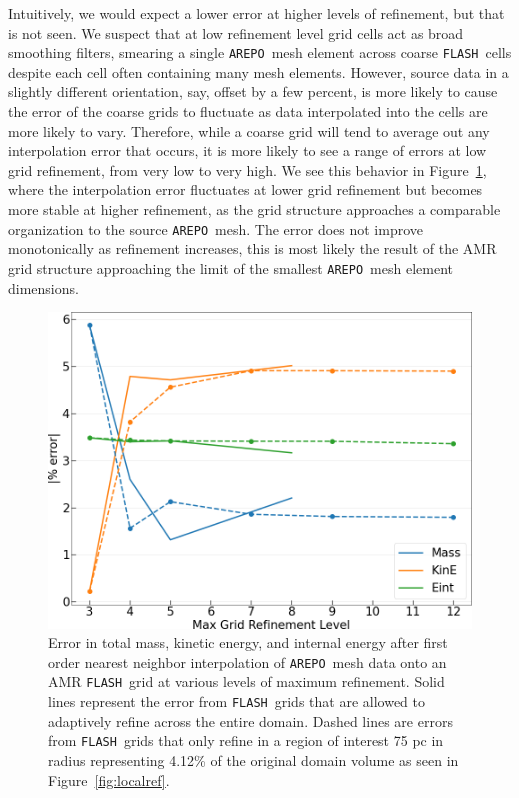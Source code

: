 \documentclass[twoside]{drexel-thesis}
\newcommand\flash{\texttt{FLASH}}
\newcommand\arepo{\texttt{AREPO}}
\begin{document}
\begin{thesis}
Intuitively, we would expect a lower error at higher levels of refinement, but that is not seen. We suspect that at low refinement level grid cells act as broad smoothing filters, smearing a single \arepo~mesh element across coarse \flash~cells despite each cell often containing many mesh elements. However, source data in a slightly different orientation, say, offset by a few percent, is more likely to cause the error of the coarse grids to fluctuate as data interpolated into the cells are more likely to vary. Therefore, while a coarse grid will tend to average out any interpolation error that occurs, it is more likely to see a range of errors at low grid refinement, from very low to very high. We see this behavior in Figure~\ref{fig:error-graph}, where the interpolation error fluctuates at lower grid refinement but becomes more stable at higher refinement, as the grid structure approaches a comparable organization to the source \arepo~mesh. %
The error does not improve monotonically as refinement increases, this is most likely the result of the AMR grid structure approaching the limit of the smallest \arepo~mesh element dimensions.


\begin{figure}[!htb]
    \includegraphics[width=\columnwidth]{interpolation-error (1).png}
    \caption{Error in total mass, kinetic energy, and internal energy after first order nearest neighbor interpolation of \arepo~mesh data onto an AMR \flash~grid at various levels of maximum refinement. Solid lines represent the error from \flash~grids that are allowed to adaptively refine across the entire domain. Dashed lines are errors from \flash~grids that only refine in a region of interest 75 pc in radius representing 4.12\% of the original domain volume as seen in Figure~\ref{fig:localref}.
    }
    \label{fig:error-graph}
\end{figure}


\end{thesis}
\end{document}
